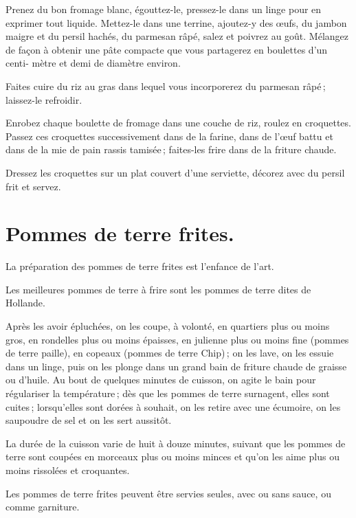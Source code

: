 Prenez du bon fromage blanc, égouttez-le, pressez-le dans un linge pour en
exprimer tout liquide. Mettez-le dans une terrine, ajoutez-y des œufs, du jambon
maigre et du persil hachés, du parmesan râpé, salez et poivrez au goût. Mélangez
de façon à obtenir une pâte compacte que vous partagerez en boulettes d'un centi-
mètre et demi de diamètre environ.

Faites cuire du riz au gras dans lequel vous incorporerez du parmesan râpé ;
laissez-le refroidir.

Enrobez chaque boulette de fromage dans une couche de riz, roulez en
croquettes. Passez ces croquettes successivement dans de la farine, dans de
l'œuf battu et dans de la mie de pain rassis tamisée ; faites-les frire dans de
la friture chaude.

Dressez les croquettes sur un plat couvert d'une serviette, décorez avec du
persil frit et servez.

\section*{\centering Pommes de terre frites.}
{}
\label{pg0714} \hypertarget{p0714}{}

La préparation des pommes de terre frites est l'enfance de l'art.

Les meilleures pommes de terre à frire sont les pommes de terre dites de
Hollande.

Après les avoir épluchées, on les coupe, à volonté, en quartiers plus ou moins
gros, en rondelles plus ou moins épaisses, en julienne plus ou moins fine (pommes
de terre paille), en copeaux (pommes de terre Chip) ; on les lave, on les essuie
dans un linge, puis on les plonge dans un grand bain de friture chaude de graisse
ou d'huile. Au bout de quelques minutes de cuisson, on agite le bain pour
régulariser la température ; dès que les pommes de terre surnagent, elles sont
cuites ; lorsqu'elles sont dorées à souhait, on les retire avec une écumoire, on
les saupoudre de sel et on les sert aussitôt.

La durée de la cuisson varie de huit à douze minutes, suivant que les pommes de
terre sont coupées en morceaux plus ou moins minces et qu'on les aime plus ou
moins rissolées et croquantes.

\medskip

Les pommes de terre frites peuvent être servies seules, avec ou sans sauce, ou
comme garniture.


